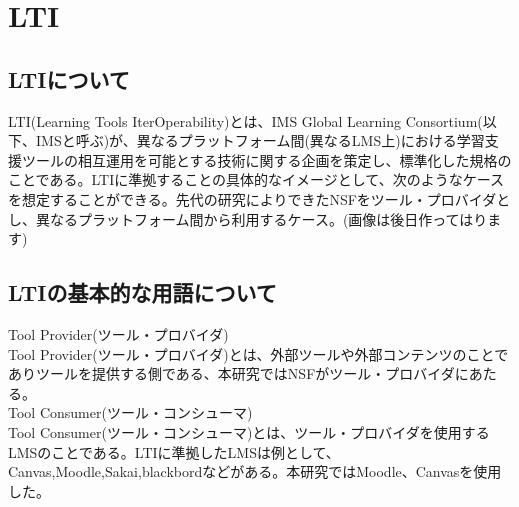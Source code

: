 \section{LTI}
\label{tag:LTI}
\subsection{LTIについて}
LTI(Learning Tools IterOperability)とは、IMS Global Learning Consortium(以下、IMSと呼ぶ)が、異なるプラットフォーム間(異なるLMS上)における学習支援ツールの相互運用を可能とする技術に関する企画を策定し、標準化した規格のことである。LTIに準拠することの具体的なイメージとして、次のようなケースを想定することができる。先代の研究によりできたNSFをツール・プロバイダとし、異なるプラットフォーム間から利用するケース。(画像は後日作ってはります)\\
\subsection{LTIの基本的な用語について}
Tool Provider(ツール・プロバイダ)\\
Tool Provider(ツール・プロバイダ)とは、外部ツールや外部コンテンツのことでありツールを提供する側である、本研究ではNSFがツール・プロバイダにあたる。\\
Tool Consumer(ツール・コンシューマ)\\
Tool Consumer(ツール・コンシューマ)とは、ツール・プロバイダを使用するLMSのことである。LTIに準拠したLMSは例として、Canvas,Moodle,Sakai,blackbordなどがある。本研究ではMoodle、Canvasを使用した。\\
